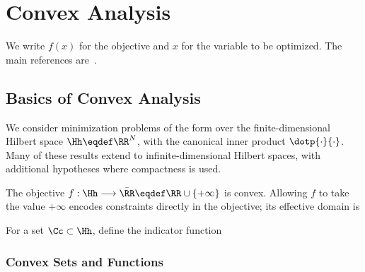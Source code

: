 
\chapter{Convex Analysis}
\label{chap-convex-optim}


We write $f(x)$ for the objective and $x$ for the variable to be optimized. The main references are~\cite{ciarlet1982introduction,boyd2004convex}.


\section{Basics of Convex Analysis}

We consider minimization problems of the form
over the finite-dimensional Hilbert space $\Hh \eqdef \RR^N$, with the canonical inner product $\dotp{\cdot}{\cdot}$.
%
Many of these results extend to infinite-dimensional Hilbert spaces, with additional hypotheses where compactness is used.

The objective $f : \Hh \longrightarrow \bar \RR \eqdef \RR \cup \{+\infty\}$ is convex. Allowing $f$ to take the value $+\infty$ encodes constraints directly in the objective; its effective domain is

For a set $\Cc \subset \Hh$, define the indicator function


\subsection{Convex Sets and Functions}

